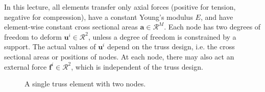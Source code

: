 In this lecture, all elements transfer only axial forces (positive for tension, negative for compression), have a constant Young's modulus $E$, and have element-wise constant cross sectional areas $\mathbf{a} \in \mathcal{R}^M$. Each node has two degrees of freedom to deform $\mathbf{u}^i \in \mathcal{R}^2$, unless a degree of freedom is constrained by a support. The actual values of $\mathbf{u}^i$ depend on the truss design, i.e. the cross sectional areas or positions of nodes. At each node, there may also act an external force $\mathbf{f}^i \in \mathcal{R}^2$, which is independent of the truss design.

\begin{figure}[!htpb]
    \centering
    
    \caption{A single truss element with two nodes.}
    \label{fig:single_truss}
\end{figure}


